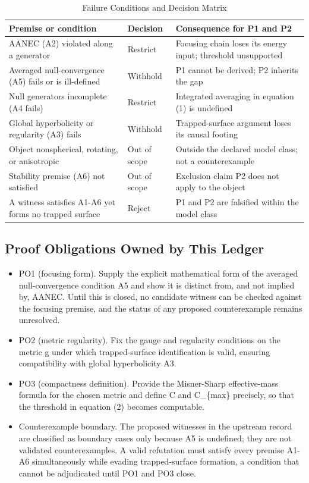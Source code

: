 \documentclass[conference]{IEEEtran}
\begin{document}
\begin{table}[htbp]
\centering
\footnotesize
\setlength{\tabcolsep}{3pt}
\renewcommand{\arraystretch}{1.12}
\caption{Failure Conditions and Decision Matrix}
\label{tab:definitions-and-propositions-def-failure}
\begin{tabular}{|p{}|p{}|p{}|}
\hline
Premise or condition & Decision & Consequence for P1 and P2 \\\hline
AANEC (A2) violated along a generator & Restrict & Focusing chain loses its energy input; threshold unsupported \\\hline
Averaged null-convergence (A5) fails or is ill-defined & Withhold & P1 cannot be derived; P2 inherits the gap \\\hline
Null generators incomplete (A4 fails) & Restrict & Integrated averaging in equation (1) is undefined \\\hline
Global hyperbolicity or regularity (A3) fails & Withhold & Trapped-surface argument loses its causal footing \\\hline
Object nonspherical, rotating, or anisotropic & Out of scope & Outside the declared model class; not a counterexample \\\hline
Stability premise (A6) not satisfied & Out of scope & Exclusion claim P2 does not apply to the object \\\hline
A witness satisfies A1-A6 yet forms no trapped surface & Reject & P1 and P2 are falsified within the model class \\\hline
\end{tabular}
\end{table}

\subsection{Proof Obligations Owned by This Ledger}
\begin{itemize}
\item PO1 (focusing form). Supply the explicit mathematical form of the averaged null-convergence condition A5 and show it is distinct from, and not implied by, AANEC. Until this is closed, no candidate witness can be checked against the focusing premise, and the status of any proposed counterexample remains unresolved.
\item PO2 (metric regularity). Fix the gauge and regularity conditions on the metric g under which trapped-surface identification is valid, ensuring compatibility with global hyperbolicity A3.
\item PO3 (compactness definition). Provide the Misner-Sharp effective-mass formula for the chosen metric and define C and C\_\{max\} precisely, so that the threshold in equation (2) becomes computable.
\item Counterexample boundary. The proposed witnesses in the upstream record are classified as boundary cases only because A5 is undefined; they are not validated counterexamples. A valid refutation must satisfy every premise A1-A6 simultaneously while evading trapped-surface formation, a condition that cannot be adjudicated until PO1 and PO3 close.
\end{itemize}
\end{document}
